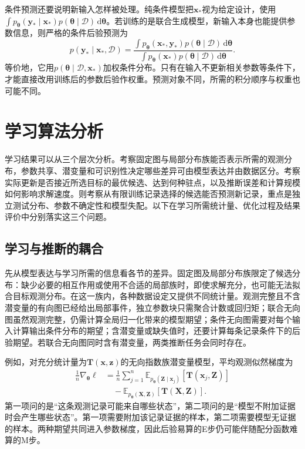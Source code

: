 条件预测还要说明新输入怎样被处理。纯条件模型把$\bm{x}_*$视为给定设计，使用$\int p_{\bm{\theta}}(\bm{y}_*\mid\bm{x}_*)p(\bm{\theta}\mid\mathcal{D})\,\mathrm{d}\bm{\theta}$。若训练的是联合生成模型，新输入本身也能提供参数信息，则严格的条件后验预测为
\[
  p(\bm{y}_*\mid\bm{x}_*,\mathcal{D})
  =\frac{\int p_{\bm{\theta}}(\bm{x}_*,\bm{y}_*)
                      p(\bm{\theta}\mid\mathcal{D})\,\mathrm{d}\bm{\theta}}
         {\int p_{\bm{\theta}}(\bm{x}_*)
                      p(\bm{\theta}\mid\mathcal{D})\,\mathrm{d}\bm{\theta}}.
\]
等价地，它用$p(\bm{\theta}\mid\mathcal{D},\bm{x}_*)$加权条件分布。只有在输入不更新相关参数等条件下，才能直接改用训练后的参数后验作权重。预测对象不同，所需的积分顺序与权重也可能不同。

\section{学习算法分析}
\label{sec:pgm-parameter-learning-analysis}

学习结果可以从三个层次分析。考察固定图与局部分布族能否表示所需的观测分布，参数共享、潜变量和可识别性决定哪些差异可由模型表达并由数据区分。考察实际更新是否接近所选目标的最优候选、达到何种驻点，以及推断误差和计算规模如何影响求解速度。则考察从有限训练记录选择的候选能否预测新记录，重点是独立测试分布、参数不确定性和模型失配。以下在学习所需统计量、优化过程及结果评价中分别落实这三个问题。

\subsection{学习与推断的耦合}
\label{sec:pgm-parameter-learning-inference-coupling}

先从模型表达与学习所需的信息看各节的差异。固定图及局部分布族限定了候选分布：缺少必要的相互作用或使用不合适的局部族时，即使求解充分，也可能无法拟合目标观测分布。在这一族内，各种数据设定又提供不同统计量。观测完整且不含潜变量的有向图已经给出局部事件，独立参数块只需聚合计数或回归矩；联合无向图虽然观测完整，仍需计算全局归一化带来的模型期望；条件无向图需要对每个输入计算输出条件分布的期望；含潜变量或缺失值时，还要计算每条记录条件下的后验期望。若联合无向图同时含有潜变量，两类推断任务会同时存在。

例如，对充分统计量为$\bm{T}(\bm{x},\bm{z})$的无向指数族潜变量模型，平均观测似然梯度为
\begin{equation}
  \begin{aligned}
    \frac{1}{n}\nabla_{\bm{\theta}}\ell
      &=\frac{1}{n}\sum_{j=1}^n
        \mathbb{E}_{p_{\bm{\theta}}(\bm{Z}\mid\bm{x}_j)}
          [\bm{T}(\bm{x}_j,\bm{Z})]\\
      &\quad-\mathbb{E}_{p_{\bm{\theta}}(\bm{X},\bm{Z})}
          [\bm{T}(\bm{X},\bm{Z})].
  \end{aligned}
  \label{eq:pgm-parameter-learning-two-expectations}
\end{equation}
第一项问的是“这条观测记录可能来自哪些状态”，第二项问的是“模型不附加证据时会产生哪些状态”。第一项需要附加该记录证据的样本，第二项需要模型无证据的样本。两种期望共同进入参数梯度，因此后验易算的E步仍可能伴随配分函数难算的M步。

